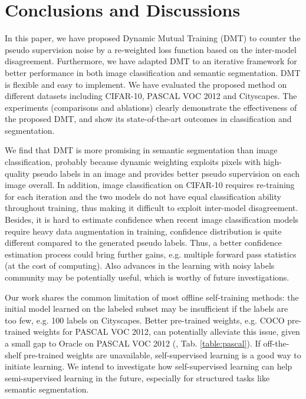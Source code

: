 \documentclass[preprint,review,10pt]{elsarticle}
\begin{document}
\section{Conclusions and Discussions}
\label{sec:7}
In this paper, we have proposed Dynamic Mutual Training (DMT) to counter the pseudo supervision noise by a re-weighted loss function based on the inter-model disagreement. Furthermore, we have adapted DMT to an iterative framework for better performance in both image classification and semantic segmentation. DMT is flexible and easy to implement.
We have evaluated the proposed method on different datasets including CIFAR-10, PASCAL VOC 2012 and Cityscapes.
The experiments (comparisons and ablations) clearly demonstrate the effectiveness of the proposed DMT, and show its state-of-the-art outcomes in classification and segmentation.

We find that DMT is more promising in semantic segmentation than image classification, probably because dynamic weighting exploits pixels with high-quality pseudo labels in an image and provides better pseudo supervision on each image overall. In addition, image classification on CIFAR-10 requires re-training for each iteration and the two models do not have equal classification ability throughout training, thus making it difficult to exploit inter-model disagreement. Besides, it is hard to estimate confidence when recent image classification models require heavy data augmentation in training, confidence distribution is quite different compared to the generated pseudo labels. Thus, a better confidence estimation process could bring further gains, e.g. multiple forward pass statistics (at the cost of computing). Also advances in the learning with noisy labels community may be potentially useful, which is worthy of future investigations.

Our work shares the common limitation of most offline self-training methods: the initial model learned on the labeled subset may be insufficient if the labels are too few, e.g. 100 labels on Cityscapes. Better pre-trained weights, e.g. COCO pre-trained weights for PASCAL VOC 2012, can potentially alleviate this issue, given a small gap to Oracle on PASCAL VOC 2012 (, Tab. \ref{table:pascal}). If off-the-shelf pre-trained weights are unavailable, self-supervised learning \cite{zhai2019s4l} is a good way to initiate learning. We intend to investigate how self-supervised learning can help semi-supervised learning in the future, especially for structured tasks like semantic segmentation.
\end{document}
